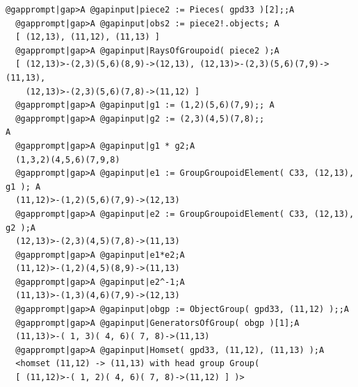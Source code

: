 \documentclass[a4paper,11pt]{report}
\begin{document}
{{\begin{Verbatim}[commandchars=@|A,fontsize=\small,frame=single,label=Example]
  @gapprompt|gap>A @gapinput|piece2 := Pieces( gpd33 )[2];;A
  @gapprompt|gap>A @gapinput|obs2 := piece2!.objects; A
  [ (12,13), (11,12), (11,13) ]
  @gapprompt|gap>A @gapinput|RaysOfGroupoid( piece2 );A
  [ (12,13)>-(2,3)(5,6)(8,9)->(12,13), (12,13)>-(2,3)(5,6)(7,9)->(11,13), 
    (12,13)>-(2,3)(5,6)(7,8)->(11,12) ]
  @gapprompt|gap>A @gapinput|g1 := (1,2)(5,6)(7,9);; A
  @gapprompt|gap>A @gapinput|g2 := (2,3)(4,5)(7,8);;                         A
  @gapprompt|gap>A @gapinput|g1 * g2;A
  (1,3,2)(4,5,6)(7,9,8)
  @gapprompt|gap>A @gapinput|e1 := GroupGroupoidElement( C33, (12,13), g1 ); A
  (11,12)>-(1,2)(5,6)(7,9)->(12,13)
  @gapprompt|gap>A @gapinput|e2 := GroupGroupoidElement( C33, (12,13), g2 );A
  (12,13)>-(2,3)(4,5)(7,8)->(11,13)
  @gapprompt|gap>A @gapinput|e1*e2;A
  (11,12)>-(1,2)(4,5)(8,9)->(11,13)
  @gapprompt|gap>A @gapinput|e2^-1;A
  (11,13)>-(1,3)(4,6)(7,9)->(12,13)
  @gapprompt|gap>A @gapinput|obgp := ObjectGroup( gpd33, (11,12) );;A
  @gapprompt|gap>A @gapinput|GeneratorsOfGroup( obgp )[1];A
  (11,13)>-( 1, 3)( 4, 6)( 7, 8)->(11,13)
  @gapprompt|gap>A @gapinput|Homset( gpd33, (11,12), (11,13) );A
  <homset (11,12) -> (11,13) with head group Group( 
  [ (11,12)>-( 1, 2)( 4, 6)( 7, 8)->(11,12) ] )>
  
\end{Verbatim}
 }

 }

         
\end{document}
